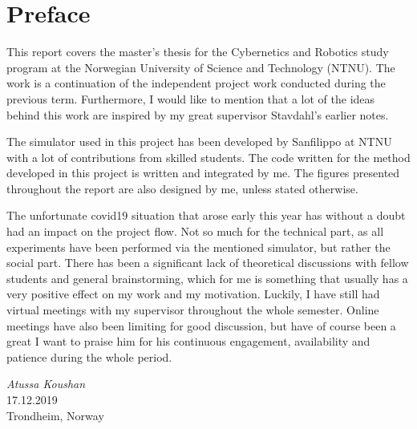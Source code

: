 \chapter{Preface}

This report covers the master's thesis for the Cybernetics and Robotics study program at the Norwegian University of Science and Technology (NTNU). The work is a continuation of the independent project work conducted during the previous term. Furthermore, I would like to mention that a lot of the ideas behind this work are inspired by my great supervisor Stavdahl's earlier notes.

The simulator used in this project has been developed by Sanfilippo at NTNU with a lot of contributions from skilled students. The code written for the method developed in this project is written and integrated by me. The figures presented throughout the report are also designed by me, unless stated otherwise.

The unfortunate covid19 situation that arose early this year has without a doubt had an impact on the project flow. Not so much for the technical part, as all experiments have been performed via the mentioned simulator, but rather the social part. There has been a significant lack of theoretical discussions with fellow students and general brainstorming, which for me is something that usually has a very positive effect on my work and my motivation. Luckily, I have still had virtual meetings with my supervisor throughout the whole semester. Online meetings have also been limiting for good discussion, but have of course been a great 
I want to praise him for his continuous engagement, availability and patience during the whole period.


\medskip
\begin {flushright}
  \textit{Atussa Koushan} \\
  \textsc {17.12.2019} \\
  Trondheim, Norway
\end {flushright}



\makeatletter
{}


\makeatother




